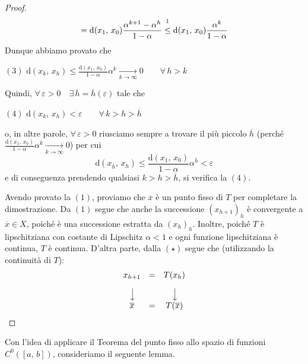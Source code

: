 \begin{proof}
$$$$
$$
= \mathrm{d}(x_1,\,x_0) \dfrac{\alpha^{k+1}-\alpha^h}{1-\alpha} \overset{\footnotemark}{\leq}
\mathrm{d}(x_1,\,x_0) \dfrac{\alpha^{k}}{1-\alpha}
$$
Dunque abbiamo provato che
\begin{center}
$\mathrm{(3)}$
\hfill
$\displaystyle
\mathrm{d}(x_k,\,x_h) \leq \frac{\mathrm{d}(x_1,\,x_0)}{1-\alpha} \alpha^{k} \underset{k \rightarrow \infty}{\longrightarrow} 0 \qquad \forall \, h > k
$
\hfill \null \\
\end{center}
Quindi, $\forall \, \varepsilon > 0 \quad \exists \, \overline{h} = \overline{h}(\varepsilon)$ tale che 
\begin{center}
$\mathrm{(4)}$
\hfill
$\displaystyle
\mathrm{d}(x_k,\,x_h) < \varepsilon \qquad \forall \, k>h>\overline{h}
$
\hfill \null \\
\end{center}
o, in altre parole, $\forall \, \varepsilon > 0$ riusciamo sempre a trovare il più piccolo $\overline{h}$ (perché $\frac{\mathrm{d}(x_1,\,x_0)}{1-\alpha} \alpha^{k} \underset{k \rightarrow \infty}{\longrightarrow} 0$) per cui
$$
\mathrm{d}(x_{\overline{h}},\,x_h) \leq \frac{\mathrm{d}(x_1,\,x_0)}{1-\alpha} \alpha^{\overline{h}} < \varepsilon
$$
e di conseguenza prendendo qualsiasi $k>h>\overline{h}$, si verifica la $\mathrm{(4)}$.

Avendo provato la $\mathrm{(1)}$, proviamo che $\overline{x}$ è un punto fisso di $T$ per completare la dimostrazione. Da $\mathrm{(1)}$ segue che anche la successione $(x_{h+1})_h$ è convergente a $\overline{x} \in X$, poiché è una successione estratta da $(x_h)_h$. Inoltre, poiché $T$ è lipschitziana con costante di Lipschitz $\alpha < 1$ e ogni funzione lipschitziana è continua, $T$ è continua. D'altra parte, dalla $\mathrm{(\star)}$ segue che (utilizzando la continuità di $T$):
$$
\begin{array}{ccc}
x_{h+1} &=& T(x_h)\\
\rotatebox{270}{$\longrightarrow$} & & \rotatebox{270}{$\longrightarrow$}\\
\overline{x} &=& T(\overline{x})\\
\end{array}
$$
\end{proof}

Con l'idea di applicare il Teorema del punto fisso allo spazio di funzioni $C^0([a,\,b])$, consideriamo il seguente lemma.


